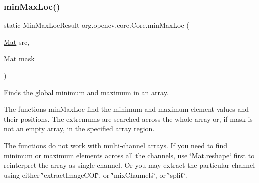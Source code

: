 \subsubsection{\texorpdfstring{min\+Max\+Loc()}{minMaxLoc()}\hspace{0.1cm}{\footnotesize\ttfamily [1/2]}}
{\footnotesize\ttfamily static Min\+Max\+Loc\+Result org.\+opencv.\+core.\+Core.\+min\+Max\+Loc (\begin{DoxyParamCaption}\item[{\mbox{\hyperlink{classorg_1_1opencv_1_1core_1_1_mat}{Mat}}}]{src,  }\item[{\mbox{\hyperlink{classorg_1_1opencv_1_1core_1_1_mat}{Mat}}}]{mask }\end{DoxyParamCaption})\hspace{0.3cm}{\ttfamily [static]}}

Finds the global minimum and maximum in an array.

The functions {\ttfamily min\+Max\+Loc} find the minimum and maximum element values and their positions. The extremums are searched across the whole array or, if {\ttfamily mask} is not an empty array, in the specified array region.

The functions do not work with multi-\/channel arrays. If you need to find minimum or maximum elements across all the channels, use \char`\"{}\+Mat.\+reshape\char`\"{} first to reinterpret the array as single-\/channel. Or you may extract the particular channel using either \char`\"{}extract\+Image\+C\+O\+I\char`\"{}, or \char`\"{}mix\+Channels\char`\"{}, or \char`\"{}split\char`\"{}.



